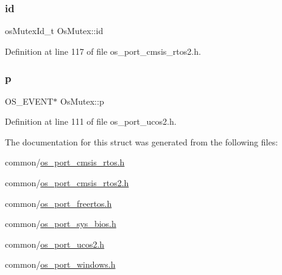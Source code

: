 \subsubsection{\texorpdfstring{id}{id}\hspace{0.1cm}{\footnotesize\ttfamily [2/2]}}
{\footnotesize\ttfamily os\+Mutex\+Id\+\_\+t Os\+Mutex\+::id}



Definition at line 117 of file os\+\_\+port\+\_\+cmsis\+\_\+rtos2.\+h.

\mbox{\label{structOsMutex_a5e04eabc2ef39cfdb9fa3430136c777a}} 
\subsubsection{\texorpdfstring{p}{p}}
{\footnotesize\ttfamily O\+S\+\_\+\+E\+V\+E\+NT$\ast$ Os\+Mutex\+::p}



Definition at line 111 of file os\+\_\+port\+\_\+ucos2.\+h.



The documentation for this struct was generated from the following files\+:\begin{DoxyCompactItemize}
\item 
common/\hyperlink{os__port__cmsis__rtos_8h}{os\+\_\+port\+\_\+cmsis\+\_\+rtos.\+h}\item 
common/\hyperlink{os__port__cmsis__rtos2_8h}{os\+\_\+port\+\_\+cmsis\+\_\+rtos2.\+h}\item 
common/\hyperlink{os__port__freertos_8h}{os\+\_\+port\+\_\+freertos.\+h}\item 
common/\hyperlink{os__port__sys__bios_8h}{os\+\_\+port\+\_\+sys\+\_\+bios.\+h}\item 
common/\hyperlink{os__port__ucos2_8h}{os\+\_\+port\+\_\+ucos2.\+h}\item 
common/\hyperlink{os__port__windows_8h}{os\+\_\+port\+\_\+windows.\+h}\end{DoxyCompactItemize}
